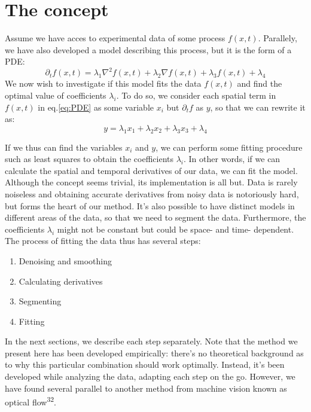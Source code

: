 \documentclass{Dissertate}
\providecommand{\tightlist}{%
  \setlength{\itemsep}{0pt}\setlength{\parskip}{0pt}}
\begin{document}
\hypertarget{the-concept}{%
\section{The concept}\label{the-concept}}

Assume we have acces to experimental data of some process \(f(x,t)\).
Parallely, we have also developed a model describing this process, but
it is the form of a PDE: \begin{equation}
\partial_t f(x,t) = \lambda_1 \nabla^2f(x,t)+\lambda_2\nabla f(x,t) +\lambda_3 f(x,t) +\lambda_4
\label{eq:PDE}\end{equation} We now wish to investigate if this model
fits the data \(f(x,t)\) and find the optimal value of coefficients
\(\lambda_i\). To do so, we consider each spatial term in \(f(x,t)\) in
eq.\ref{eq:PDE} as some variable \(x_i\) but \(\partial_t f\) as \(y\),
so that we can rewrite it as: \[
y = \lambda_1 x_1+\lambda_2x_2 +\lambda_3 x_3 +\lambda_4
\]

If we thus can find the variables \(x_i\) and \(y\), we can perform some
fitting procedure such as least squares to obtain the coefficients
\(\lambda_i\). In other words, if we can calculate the spatial and
temporal derivatives of our data, we can fit the model. Although the
concept seems trivial, its implementation is all but. Data is rarely
noiseless and obtaining accurate derivatives from noisy data is
notoriously hard, but forms the heart of our method. It's also possible
to have distinct models in different areas of the data, so that we need
to segment the data. Furthermore, the coefficients \(\lambda_i\) might
not be constant but could be space- and time- dependent. The process of
fitting the data thus has several steps:

\begin{enumerate}
\def\labelenumi{\arabic{enumi}.}
\tightlist
\item
  Denoising and smoothing
\item
  Calculating derivatives
\item
  Segmenting
\item
  Fitting
\end{enumerate}

In the next sections, we describe each step separately. Note that the
method we present here has been developed empirically: there's no
theoretical background as to why this particular combination should work
optimally. Instead, it's been developed while analyzing the data,
adapting each step on the go. However, we have found several parallel to
another method from machine vision known as optical
flow\textsuperscript{32}.
\end{document}
